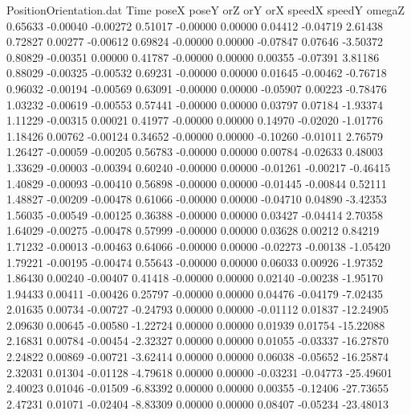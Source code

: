 \begin{filecontents}{PositionOrientation.dat}
Time poseX poseY orZ orY orX speedX speedY omegaZ
   0.65633   -0.00040   -0.00272     0.51017   -0.00000    0.00000    0.04412   -0.04719    2.61438
   0.72827    0.00277   -0.00612     0.69824   -0.00000    0.00000   -0.07847    0.07646   -3.50372
   0.80829   -0.00351    0.00000     0.41787   -0.00000    0.00000    0.00355   -0.07391    3.81186
   0.88029   -0.00325   -0.00532     0.69231   -0.00000    0.00000    0.01645   -0.00462   -0.76718
   0.96032   -0.00194   -0.00569     0.63091   -0.00000    0.00000   -0.05907    0.00223   -0.78476
   1.03232   -0.00619   -0.00553     0.57441   -0.00000    0.00000    0.03797    0.07184   -1.93374
   1.11229   -0.00315    0.00021     0.41977   -0.00000    0.00000    0.14970   -0.02020   -1.01776
   1.18426    0.00762   -0.00124     0.34652   -0.00000    0.00000   -0.10260   -0.01011    2.76579
   1.26427   -0.00059   -0.00205     0.56783   -0.00000    0.00000    0.00784   -0.02633    0.48003
   1.33629   -0.00003   -0.00394     0.60240   -0.00000    0.00000   -0.01261   -0.00217   -0.46415
   1.40829   -0.00093   -0.00410     0.56898   -0.00000    0.00000   -0.01445   -0.00844    0.52111
   1.48827   -0.00209   -0.00478     0.61066   -0.00000    0.00000   -0.04710    0.04890   -3.42353
   1.56035   -0.00549   -0.00125     0.36388   -0.00000    0.00000    0.03427   -0.04414    2.70358
   1.64029   -0.00275   -0.00478     0.57999   -0.00000    0.00000    0.03628    0.00212    0.84219
   1.71232   -0.00013   -0.00463     0.64066   -0.00000    0.00000   -0.02273   -0.00138   -1.05420
   1.79221   -0.00195   -0.00474     0.55643   -0.00000    0.00000    0.06033    0.00926   -1.97352
   1.86430    0.00240   -0.00407     0.41418   -0.00000    0.00000    0.02140   -0.00238   -1.95170
   1.94433    0.00411   -0.00426     0.25797   -0.00000    0.00000    0.04476   -0.04179   -7.02435
   2.01635    0.00734   -0.00727    -0.24793    0.00000    0.00000   -0.01112    0.01837  -12.24905
   2.09630    0.00645   -0.00580    -1.22724    0.00000    0.00000    0.01939    0.01754  -15.22088
   2.16831    0.00784   -0.00454    -2.32327    0.00000    0.00000    0.01055   -0.03337  -16.27870
   2.24822    0.00869   -0.00721    -3.62414    0.00000    0.00000    0.06038   -0.05652  -16.25874
   2.32031    0.01304   -0.01128    -4.79618    0.00000    0.00000   -0.03231   -0.04773  -25.49601
   2.40023    0.01046   -0.01509    -6.83392    0.00000    0.00000    0.00355   -0.12406  -27.73655
   2.47231    0.01071   -0.02404    -8.83309    0.00000    0.00000    0.08407   -0.05234  -23.48013

\end{filecontents}
